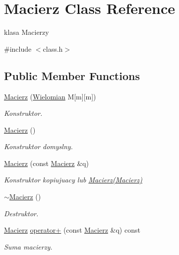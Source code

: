 \hypertarget{class_macierz}{\section{Macierz Class Reference}
\label{class_macierz}
}


klasa Macierzy  




{\ttfamily \#include $<$class.\-h$>$}

\subsection*{Public Member Functions}
\begin{DoxyCompactItemize}
\item 
\hyperlink{class_macierz_a4e4f4808e89b308cb4baedd1cda97ff6}{Macierz} (\hyperlink{class_wielomian}{Wielomian} M\mbox{[}m\mbox{]}\mbox{[}m\mbox{]})
\begin{DoxyCompactList}\small\item\em Konstruktor. \end{DoxyCompactList}\item 
\hyperlink{class_macierz_a7938791bd96a167a9f09ff6c2e319f20}{Macierz} ()
\begin{DoxyCompactList}\small\item\em Konstruktor domyslny. \end{DoxyCompactList}\item 
\hyperlink{class_macierz_a2fd019924bd187a2461fdda25ec18cec}{Macierz} (const \hyperlink{class_macierz}{Macierz} \&q)
\begin{DoxyCompactList}\small\item\em Konstruktor kopiujuacy lub \hyperlink{class_macierz}{Macierz(\-Macierz)} \end{DoxyCompactList}\item 
\hyperlink{class_macierz_aa3496af464775e250c89bac9ed808a61}{$\sim$\-Macierz} ()
\begin{DoxyCompactList}\small\item\em Destruktor. \end{DoxyCompactList}\item 
\hyperlink{class_macierz}{Macierz} \hyperlink{class_macierz_a26528431819e22809e153243c28467b7}{operator+} (const \hyperlink{class_macierz}{Macierz} \&q) const 
\begin{DoxyCompactList}\small\item\em Suma macierzy. \end{DoxyCompactList}\item 

\end{DoxyCompactItemize}
